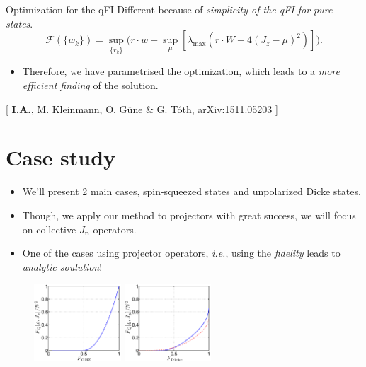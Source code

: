 \documentclass{beamer}
\newcommand{\citate}[1]{{\footnotesize{\color{gray}[ #1 ]}}

	}
\begin{document}
		\begin{frame}
			\begin{block}
				{Optimization for the qFI}
				Different because of \emph{\color{blue} simplicity of the qFI for pure states}.
				{\small
				\[
				\mathcal{F}(\{w_k\}) = \sup_{\{r_k\}} \big( r\cdot w - \sup_{\mu} [ \lambda_{\max} ( r\cdot W - 4(J_z-\mu)^2 ) ] \big).
				\]}
			\end{block}
			\begin{itemize}
				\item Therefore, we have parametrised the optimization, which leads to a \emph{more efficient finding} of the solution.

			\end{itemize}

			\citate{{\bf I.A.}, M. Kleinmann, O. G\"une \& G. T\'oth, arXiv:1511.05203}

		\end{frame}

\section{Case study}

		\begin{frame}
			\tableofcontents[currentsection]

		\end{frame}

		\begin{frame}
			\begin{itemize}
				\item We'll present 2 main cases, spin-squeezed states and unpolarized Dicke states.
				\item Though, we apply our method to projectors with great success, we will focus on collective $J_{\mathbf n}$ operators.
				\item One of the cases using projector operators, {\it i.e.}, using the \emph{fidelity} leads to \emph{\color{blue}analytic soulution}!
			\end{itemize}
			\begin{figure}
				\includegraphics[height=110px]{img/lb-ghzfidelity.pdf}
				\hspace{10px}
				\includegraphics[height=110px]{img/lb-dickefidelity}
			\end{figure}

		\end{frame}
\end{document}
